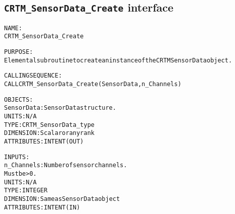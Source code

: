 \subsection{\texttt{CRTM\_SensorData\_Create} interface}
  \label{sec:CRTM_SensorData_Create_interface}
  \begin{alltt}
 
  NAME:
        CRTM_SensorData_Create
 
  PURPOSE:
        Elemental subroutine to create an instance of the CRTM SensorData object.
 
  CALLING SEQUENCE:
        CALL CRTM_SensorData_Create( SensorData, n_Channels )
 
  OBJECTS:
        SensorData:   SensorData structure.
                      UNITS:      N/A
                      TYPE:       CRTM_SensorData_type
                      DIMENSION:  Scalar or any rank
                      ATTRIBUTES: INTENT(OUT)
 
  INPUTS:
        n_Channels:   Number of sensor channels.
                      Must be > 0.
                      UNITS:      N/A
                      TYPE:       INTEGER
                      DIMENSION:  Same as SensorData object
                      ATTRIBUTES: INTENT(IN)
 
  \end{alltt}
